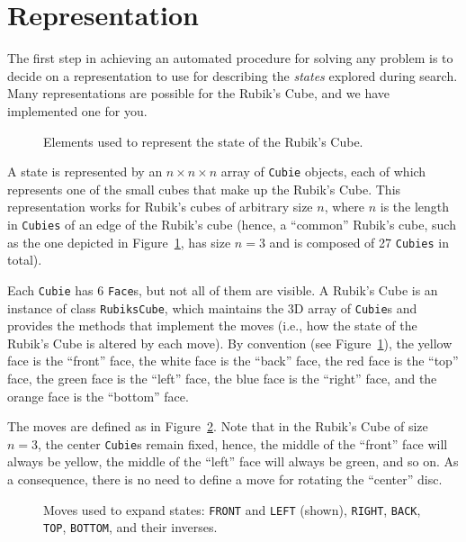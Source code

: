 \documentclass[a4paper]{article}
\begin{document}
\section{Representation}
The first step in achieving an automated procedure for solving any problem is to decide on a representation to use for describing the {\em states} explored during search.  Many representations are possible for the Rubik's Cube, and we have implemented one for you.

\begin{figure}[!ht]
\centering

\caption{{\small Elements used to represent the state of the Rubik's Cube.}}
\label{fig:rcState}
\end{figure}

A state is represented by an $n \times n \times n$ array of {\tt Cubie} objects, each of which represents one of the small cubes that make up the Rubik's Cube. This representation works for Rubik's cubes of arbitrary size $n$, where $n$ is the length in {\tt Cubies} of an edge of the Rubik's cube (hence, a ``common'' Rubik's cube, such as the one depicted in Figure~\ref{fig:rcState}, has size $n = 3$ and is composed of 27 {\tt Cubies} in total).

Each {\tt Cubie} has 6 {\tt Face}s, but not all of them are visible.  A Rubik's Cube is an instance of class {\tt RubiksCube}, which maintains the 3D array of {\tt Cubie}s and provides the methods that implement the moves (i.e., how the state of the Rubik's Cube is altered by each move).  By convention (see Figure~\ref{fig:rcState}), the yellow face is the ``front'' face, the white face is the ``back'' face, the red face is the ``top'' face, the green face is the ``left'' face, the blue face is the ``right'' face, and the orange face is the ``bottom'' face.  

The moves are defined as in Figure~\ref{fig:rcMoves}.  Note that in the Rubik's Cube of size $n = 3$, the center {\tt Cubie}s remain fixed, hence, the middle of the ``front'' face will always be yellow, the middle of the ``left'' face will always be green, and so on. As a consequence, there is no need to define a move for rotating the ``center'' disc.

\begin{figure}[!ht]
\centering

\caption{{\small Moves used to expand states: {\tt FRONT} and {\tt LEFT} (shown), {\tt RIGHT}, {\tt BACK}, {\tt TOP}, {\tt BOTTOM}, and their inverses.}}
\label{fig:rcMoves}
\end{figure}
\end{document}
